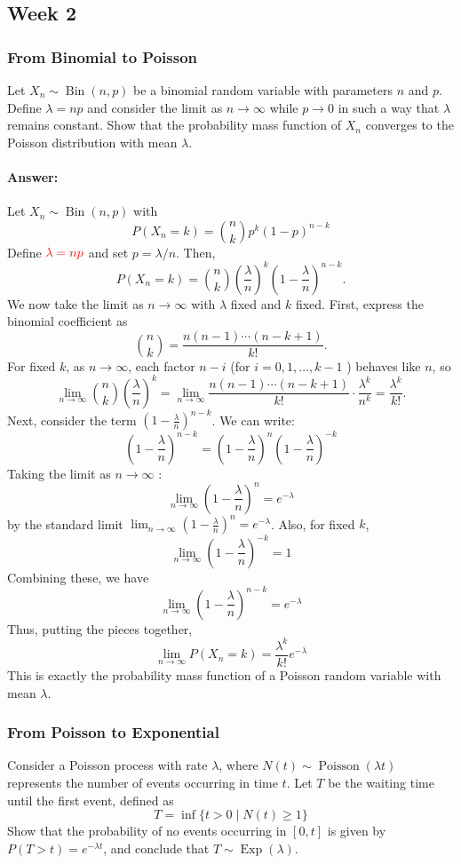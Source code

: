 \documentclass[11pt, headings=standardclasses, parskip=half, twoside]{scrartcl}
\begin{document}
\subsection{Week 2}
\subsubsection{From Binomial to Poisson}
Let $X_n \sim \operatorname{Bin}(n, p)$ be a binomial random variable with parameters $n$ and $p$. 
Define $\lambda=n p$ and consider the limit as $n \rightarrow \infty$ while $p \rightarrow 0$ in such a way that $\lambda$ remains constant. 
Show that the probability mass function of $X_n$ converges to the Poisson distribution with mean $\lambda$.
\paragraph{Answer:}
Let $X_n \sim \operatorname{Bin}(n, p)$ with
$$
P\left(X_n=k\right)=\binom{n}{k} p^k(1-p)^{n-k}
$$
Define $\textcolor{red}{\lambda=n p}$ and set $p=\lambda / n$. Then,
$$
P\left(X_n=k\right)=\binom{n}{k}\left(\frac{\lambda}{n}\right)^k\left(1-\frac{\lambda}{n}\right)^{n-k} .
$$
We now take the limit as $n \rightarrow \infty$ with $\lambda$ fixed and $k$ fixed.
First, express the binomial coefficient as
$$
\binom{n}{k}=\frac{n(n-1) \cdots(n-k+1)}{k!} .
$$
For fixed $k$, as $n \rightarrow \infty$, each factor $n-i$ (for $i=0,1, \ldots, k-1$ ) behaves like $n$, so
$$
\lim _{n \rightarrow \infty}\binom{n}{k}\left(\frac{\lambda}{n}\right)^k=\lim _{n \rightarrow \infty} \frac{n(n-1) \cdots(n-k+1)}{k!} \cdot \frac{\lambda^k}{n^k}=\frac{\lambda^k}{k!} .
$$
Next, consider the term $\left(1-\frac{\lambda}{n}\right)^{n-k}$. We can write:
$$
\left(1-\frac{\lambda}{n}\right)^{n-k}=\left(1-\frac{\lambda}{n}\right)^n\left(1-\frac{\lambda}{n}\right)^{-k}
$$
Taking the limit as $n \rightarrow \infty$ :
$$
\lim _{n \rightarrow \infty}\left(1-\frac{\lambda}{n}\right)^n=e^{-\lambda}
$$
by the standard limit $\lim _{n \rightarrow \infty}\left(1-\frac{\lambda}{n}\right)^n=e^{-\lambda}$. Also, for fixed $k$,
$$
\lim _{n \rightarrow \infty}\left(1-\frac{\lambda}{n}\right)^{-k}=1
$$
Combining these, we have
$$
\lim _{n \rightarrow \infty}\left(1-\frac{\lambda}{n}\right)^{n-k}=e^{-\lambda}
$$
Thus, putting the pieces together,
$$
\lim _{n \rightarrow \infty} P\left(X_n=k\right)=\frac{\lambda^k}{k!} e^{-\lambda}
$$
This is exactly the probability mass function of a Poisson random variable with mean $\lambda$.

\subsubsection{From Poisson to Exponential}
Consider a Poisson process with rate $\lambda$, where $N(t) \sim \operatorname{Poisson}(\lambda t)$ represents the number of events occurring in time $t$. Let $T$ be the waiting time until the first event, defined as
$$
T=\inf \{t>0 \mid N(t) \geq 1\}
$$
Show that the probability of no events occurring in $[0, t]$ is given by $P(T>t)=e^{-\lambda t}$, and conclude that $T \sim \operatorname{Exp}(\lambda)$.
\end{document}
